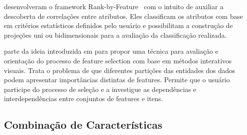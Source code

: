 \citeauthor{Shneiderman2004} desenvolveram o framework Rank-by-Feature~\cite{Shneiderman2004} com o intuito de auxiliar a descoberta de correlações entre atributos. Eles classificam os atributos com base em critérios estatísticos definidos pelo usuário e possibilitam a construção de projeções uni ou bidimensionais para a avaliação da classificação realizada. 



\cite{May2011} parte da ideia introduzida em \cite{May2011ss} para propor uma técnica para avaliação e orientação do processo de feature selection com base em métodos interativos visuais. Trata o problema de que diferentes partições das entidades dos dados podem apresentar  importâncias distintas de features. Permite que o usuário participe do processo de seleção e a investigue as dependências e interdependências entre conjuntos de features e itens.


\subsection{Combinação de Características}


